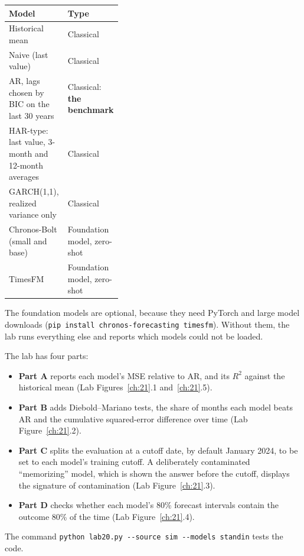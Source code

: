 \begin{center}
\small
\begin{tabularx}{0.9\linewidth}{@{}>{\raggedright\arraybackslash}X>{\raggedright\arraybackslash}p{0.38\linewidth}@{}}
\toprule
Model & Type \\
\midrule
Historical mean & Classical \\
Naive (last value) & Classical \\
AR, lags chosen by BIC on the last 30 years & Classical: \textbf{the benchmark} \\
HAR-type: last value, 3-month and 12-month averages & Classical \\
GARCH(1,1), realized variance only & Classical \\
Chronos-Bolt (small and base) & Foundation model, zero-shot \\
TimesFM & Foundation model, zero-shot \\
\bottomrule
\end{tabularx}
\end{center}

The foundation models are optional, because they need PyTorch and large model downloads (\texttt{pip install chronos-forecasting timesfm}). Without them, the lab runs everything else and reports which models could not be loaded.

The lab has four parts:

\begin{itemize}
  \item \textbf{Part A} reports each model's MSE relative to AR, and its $R^2$ against the historical mean (Lab Figures~\ref{ch:21}.1 and~\ref{ch:21}.5).
  \item \textbf{Part B} adds Diebold--Mariano tests, the share of months each model beats AR and the cumulative squared-error difference over time (Lab Figure~\ref{ch:21}.2).
  \item \textbf{Part C} splits the evaluation at a cutoff date, by default January 2024, to be set to each model's training cutoff. A deliberately contaminated ``memorizing'' model, which is shown the answer before the cutoff, displays the signature of contamination (Lab Figure~\ref{ch:21}.3).
  \item \textbf{Part D} checks whether each model's 80\% forecast intervals contain the outcome 80\% of the time (Lab Figure~\ref{ch:21}.4).
\end{itemize}

The command \texttt{python lab20.py -{}-source sim -{}-models standin} tests the code.

